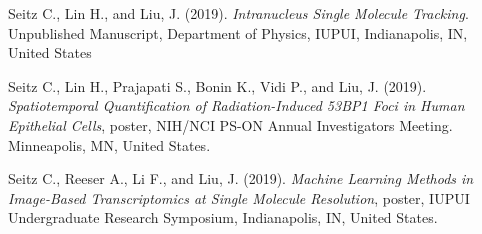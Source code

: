 \documentclass[margin, 10pt]{res} %
\begin{document}
\begin{resume}
Seitz C., Lin H., and Liu, J. (2019). \textit{Intranucleus Single Molecule Tracking}. Unpublished Manuscript, Department of Physics, IUPUI, Indianapolis, IN, United States	

Seitz C., Lin H., Prajapati S., Bonin K., Vidi P., and Liu, J. (2019). \textit{Spatiotemporal Quantification of Radiation-Induced 53BP1 Foci in Human Epithelial Cells}, poster, NIH/NCI PS-ON Annual Investigators Meeting. Minneapolis, MN, United States.

Seitz C., Reeser A., Li F., and Liu, J. (2019). \textit{Machine Learning Methods in Image-Based Transcriptomics at Single Molecule Resolution}, poster, IUPUI Undergraduate Research Symposium, Indianapolis, IN, United States.

\end{resume}
\end{document}
